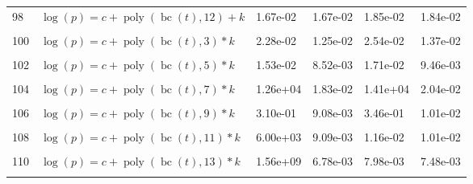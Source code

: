 \documentclass[12pt,a4paper]{article}
\DeclareMathOperator{\bc}{bc}
\DeclareMathOperator{\poly}{poly}
\begin{document}
\begin{longtable}[t]{ll>{\raggedleft\arraybackslash}p{2cm}>{\raggedleft\arraybackslash}p{2cm}>{\raggedleft\arraybackslash}p{2cm}>{\raggedleft\arraybackslash}p{2cm}}
98 & $\log(p) = c + \poly\left( \bc(t), 12 \right) + k$ & 1.67e-02 & 1.67e-02 & 1.85e-02 & 1.84e-02\\
\cellcolor{gray!6}{99} & \cellcolor{gray!6}{$\log(p) = c + \poly\left( \bc(t), 13 \right) + k$} & \cellcolor{gray!6}{1.68e-02} & \cellcolor{gray!6}{1.67e-02} & \cellcolor{gray!6}{1.85e-02} & \cellcolor{gray!6}{1.84e-02}\\
100 & $\log(p) = c + \poly\left( \bc(t), 3 \right) * k$ & 2.28e-02 & 1.25e-02 & 2.54e-02 & 1.37e-02\\
\cellcolor{gray!6}{101} & \cellcolor{gray!6}{$\log(p) = c + \poly\left( \bc(t), 4 \right) * k$} & \cellcolor{gray!6}{2.40e-02} & \cellcolor{gray!6}{2.29e-02} & \cellcolor{gray!6}{2.68e-02} & \cellcolor{gray!6}{2.55e-02}\\
102 & $\log(p) = c + \poly\left( \bc(t), 5 \right) * k$ & 1.53e-02 & 8.52e-03 & 1.71e-02 & 9.46e-03\\
\cellcolor{gray!6}{103} & \cellcolor{gray!6}{$\log(p) = c + \poly\left( \bc(t), 6 \right) * k$} & \cellcolor{gray!6}{1.26e-02} & \cellcolor{gray!6}{9.16e-03} & \cellcolor{gray!6}{1.40e-02} & \cellcolor{gray!6}{1.02e-02}\\
104 & $\log(p) = c + \poly\left( \bc(t), 7 \right) * k$ & 1.26e+04 & 1.83e-02 & 1.41e+04 & 2.04e-02\\
\cellcolor{gray!6}{105} & \cellcolor{gray!6}{$\log(p) = c + \poly\left( \bc(t), 8 \right) * k$} & \cellcolor{gray!6}{2.08e-02} & \cellcolor{gray!6}{1.41e-02} & \cellcolor{gray!6}{2.32e-02} & \cellcolor{gray!6}{1.57e-02}\\
106 & $\log(p) = c + \poly\left( \bc(t), 9 \right) * k$ & 3.10e-01 & 9.08e-03 & 3.46e-01 & 1.01e-02\\
\cellcolor{gray!6}{107} & \cellcolor{gray!6}{$\log(p) = c + \poly\left( \bc(t), 10 \right) * k$} & \cellcolor{gray!6}{5.90e+00} & \cellcolor{gray!6}{1.21e-02} & \cellcolor{gray!6}{6.59e+00} & \cellcolor{gray!6}{1.34e-02}\\
108 & $\log(p) = c + \poly\left( \bc(t), 11 \right) * k$ & 6.00e+03 & 9.09e-03 & 1.16e-02 & 1.01e-02\\
\cellcolor{gray!6}{109} & \cellcolor{gray!6}{$\log(p) = c + \poly\left( \bc(t), 12 \right) * k$} & \cellcolor{gray!6}{3.44e+08} & \cellcolor{gray!6}{7.68e-03} & \cellcolor{gray!6}{1.10e-01} & \cellcolor{gray!6}{8.49e-03}\\
110 & $\log(p) = c + \poly\left( \bc(t), 13 \right) * k$ & 1.56e+09 & 6.78e-03 & 7.98e-03 & 7.48e-03\\
\cellcolor{gray!6}{111} & \cellcolor{gray!6}{$\log(p) = c + \poly\left( \bc(t), 3 \right) + \log(k)$} & \cellcolor{gray!6}{2.57e-02} & \cellcolor{gray!6}{1.97e-02} & \cellcolor{gray!6}{2.85e-02} & \cellcolor{gray!6}{2.18e-02}\\

\end{longtable}
\end{document}
